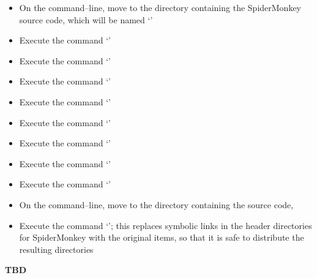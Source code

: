 \begin{itemize}
\item On the command--line, move to the directory containing the SpiderMonkey source code,
which will be named `'
\item Execute the command `'
\item Execute the command `'
\item Execute the command `'
\item Execute the command `'
\item Execute the command `'
\item Execute the command `'
\item Execute the command `'
\item Execute the command `'
\item On the command--line, move to the directory containing the \mplusm{} source code,
\item Execute the command
`'; this replaces
symbolic links in the header directories for SpiderMonkey with the original items, so that
it is safe to distribute the resulting directories
\end{itemize}
\tertiaryEnd{}
\textbf{TBD}
\tertiaryEnd{}
\secondaryEnd{}
